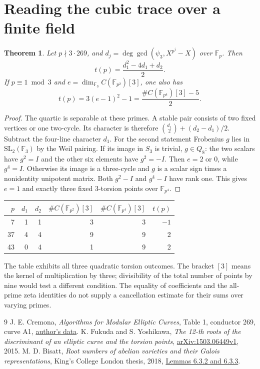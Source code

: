 \documentclass[11pt]{article}
\newtheorem{theorem}{Theorem}
\newcommand{\F}{\mathbb F}
\begin{document}
\section{Reading the cubic trace over a finite field}
\begin{theorem}\label{trace}
Let \(p\nmid3\cdot269\), and \(d_j=\deg\gcd(\psi_3,X^{p^j}-X)\) over
\(\F_p\). Then
\[
 t(p)=\frac{d_1^2-4d_1+d_2}{2}.
\]
If \(p\equiv1\bmod3\) and \(e=\dim_{\F_3} C(\F_{p^2})[3]\), one also has
\[
 t(p)=3(e-1)^2-1=\frac{\#C(\F_{p^4})[3]-5}{2}.
\]
\end{theorem}
\begin{proof}
The quartic is separable at these primes. A stable pair consists of two
fixed vertices or one two-cycle. Its character is therefore
\(\binom{d_1}{2}+(d_2-d_1)/2\). Subtract the four-line character \(d_1\).
For the second statement Frobenius \(g\) lies in \(\mathrm{SL}_2(\F_3)\)
by the Weil pairing. If its image in \(S_3\) is trivial, \(g\in Q_8\):
the two scalars have \(g^2=I\) and the other six elements have \(g^2=-I\).
Then \(e=2\) or \(0\), while \(g^4=I\).
Otherwise its image is a three-cycle and \(g\) is a scalar sign times a
nonidentity unipotent matrix. Both \(g^2-I\) and \(g^4-I\) have rank one.
This gives \(e=1\) and exactly three fixed 3-torsion points over \(\F_{p^4}\).
\end{proof}
\begin{center}
\begin{tabular}{rrrrrr}
\toprule
\(p\)&\(d_1\)&\(d_2\)&\(\#C(\F_{p^2})[3]\)&\(\#C(\F_{p^4})[3]\)&\(t(p)\)\\
\midrule
7&1&1&3&3&\(-1\)\\
37&4&4&9&9&2\\
43&0&4&1&9&2\\
\bottomrule
\end{tabular}
\end{center}
The table exhibits all three quadratic torsion outcomes. The bracket \([3]\)
means the kernel of multiplication by three; divisibility of the total
number of points by nine would test a different condition.
The equality of coefficients and the all-prime zeta identities do not
supply a cancellation estimate for their sums over varying primes.

\begin{thebibliography}{9}
 J. E. Cremona, \emph{Algorithms for Modular Elliptic Curves},
Table 1, conductor 269, curve A1, \href{https://johncremona.github.io/ecdata/}{author's data}.
 K. Fukuda and S. Yoshikawa, \emph{The 12-th roots of the discriminant
of an elliptic curve and the torsion points}, \href{https://arxiv.org/abs/1503.06449v1}{arXiv:1503.06449v1}, 2015.
 M. D. Bisatt, \emph{Root numbers of abelian varieties and their
Galois representations}, King's College London thesis, 2018,
\href{https://kclpure.kcl.ac.uk/portal/files/100287607/2018_Bisatt_Matthew_David_1681190_ethesis.pdf}{Lemmas 6.3.2 and 6.3.3}.
\end{thebibliography}
\end{document}
